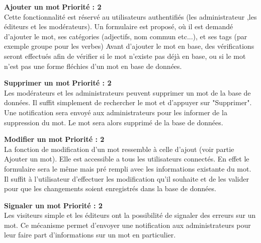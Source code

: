 \documentclass[12pt,a4paper]{article}
\begin{document}
\textbf{Ajouter un mot}
 \textbf{Priorité : 2}
\\ Cette fonctionnalité est réservé au utilisateurs authentifiés (les administrateur ,les éditeurs et les modérateurs). Un formulaire est proposé, où il est demandé d'ajouter le mot, ses catégories (adjectifs, nom commun etc...), et ses tags (par exemple groupe pour les verbes)
Avant d'ajouter le mot en base, des vérifications seront effectués afin  de vérifier si le mot n'existe pas déjà en base, ou si le mot n'est pas une forme fléchies d'un mot en base de données.


\textbf{Supprimer un mot}
 \textbf{Priorité : 2} \\ 
 Les modérateurs et les administrateurs peuvent supprimer un mot de la base de données. Il suffit simplement de rechercher le mot et d'appuyer sur "Supprimer". Une notification sera envoyé aux administrateurs pour les informer de la suppression du mot. Le mot sera alors supprimé de la base de données.

\textbf{Modifier un mot}
 \textbf{Priorité : 2} \\ 
 La fonction de modification d'un mot ressemble à celle d'ajout (voir partie Ajouter un mot). Elle est accessible a tous les utilisateurs connectés. En effet le formulaire sera le même mais pré rempli avec les informations existante du mot. Il suffit à  l'utilisateur d'effectuer les modification qu'il souhaite et de les valider pour que les changements soient enregistrés dans la base de données.

\textbf{Signaler un mot}
 \textbf{Priorité : 2}
 \\ Les visiteurs simple et les éditeurs ont la possibilité de signaler des erreurs sur un mot. Ce mécanisme permet d'envoyer une notification aux administrateurs pour leur faire part d'informations sur un mot en particulier. 
\end{document}
